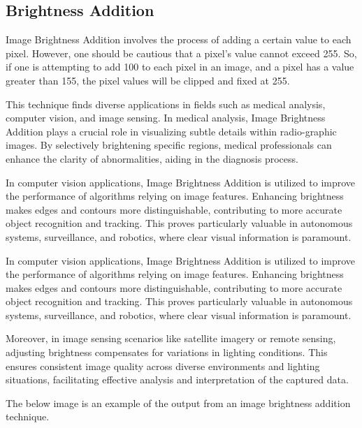 \subsection{Brightness Addition}
\par Image Brightness Addition involves the process of adding a certain value to each pixel. However, one should be cautious that a pixel's value cannot exceed 255. So, if one is attempting to add 100 to each pixel in an image, and a pixel has a value greater than 155, the pixel values will be clipped and fixed at 255.\newline
\par This technique finds diverse applications in fields such as medical analysis, computer vision, and image sensing. In medical analysis, Image Brightness Addition plays a crucial role in visualizing subtle details within radio-graphic images. By selectively brightening specific regions, medical professionals can enhance the clarity of abnormalities, aiding in the diagnosis process. \newline
\par In computer vision applications, Image Brightness Addition is utilized to improve the performance of algorithms relying on image features. Enhancing brightness makes edges and contours more distinguishable, contributing to more accurate object recognition and tracking. This proves particularly valuable in autonomous systems, surveillance, and robotics, where clear visual information is paramount. \newline
\par In computer vision applications, Image Brightness Addition is utilized to improve the performance of algorithms relying on image features. Enhancing brightness makes edges and contours more distinguishable, contributing to more accurate object recognition and tracking. This proves particularly valuable in autonomous systems, surveillance, and robotics, where clear visual information is paramount. \newline
\par Moreover, in image sensing scenarios like satellite imagery or remote sensing, adjusting brightness compensates for variations in lighting conditions. This ensures consistent image quality across diverse environments and lighting situations, facilitating effective analysis and interpretation of the captured data. \newline
\par The below image is an example of the output from an image brightness addition technique. \newline

